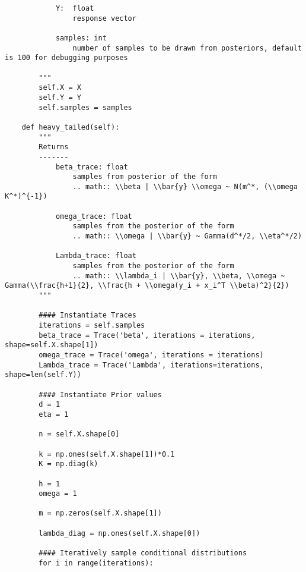 \documentclass[10pt]{article}
\begin{document}
\begin{lstlisting}
            Y:  float
                response vector

            samples: int
                number of samples to be drawn from posteriors, default is 100 for debugging purposes

        """
        self.X = X
        self.Y = Y
        self.samples = samples

    def heavy_tailed(self):
        """
        Returns
        -------
            beta_trace: float
                samples from posterior of the form
                .. math:: \\beta | \\bar{y} \\omega ~ N(m^*, (\\omega K^*)^{-1})

            omega_trace: float
                samples from the posterior of the form
                .. math:: \\omega | \\bar{y} ~ Gamma(d^*/2, \\eta^*/2)

            Lambda_trace: float
                samples from the posterior of the form
                .. math:: \\lambda_i | \\bar{y}, \\beta, \\omega ~ Gamma(\\frac{h+1}{2}, \\frac{h + \\omega(y_i + x_i^T \\beta)^2}{2})
        """

        #### Instantiate Traces
        iterations = self.samples
        beta_trace = Trace('beta', iterations = iterations, shape=self.X.shape[1])
        omega_trace = Trace('omega', iterations = iterations)
        Lambda_trace = Trace('Lambda', iterations=iterations, shape=len(self.Y))

        #### Instantiate Prior values
        d = 1
        eta = 1

        n = self.X.shape[0]

        k = np.ones(self.X.shape[1])*0.1
        K = np.diag(k)

        h = 1
        omega = 1

        m = np.zeros(self.X.shape[1])

        lambda_diag = np.ones(self.X.shape[0])
        
        #### Iteratively sample conditional distributions
        for i in range(iterations):


\end{lstlisting}
\end{document}
